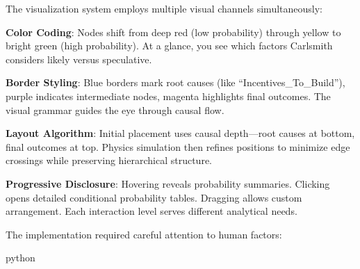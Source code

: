\documentclass[
  11pt,
  letterpaper,
]{book}
\begin{document}
The visualization system employs multiple visual channels
simultaneously:

\textbf{Color Coding}: Nodes shift from deep red (low probability)
through yellow to bright green (high probability). At a glance, you see
which factors Carlsmith considers likely versus speculative.

\textbf{Border Styling}: Blue borders mark root causes (like
``Incentives\_To\_Build''), purple indicates intermediate nodes, magenta
highlights final outcomes. The visual grammar guides the eye through
causal flow.

\textbf{Layout Algorithm}: Initial placement uses causal depth---root
causes at bottom, final outcomes at top. Physics simulation then refines
positions to minimize edge crossings while preserving hierarchical
structure.

\textbf{Progressive Disclosure}: Hovering reveals probability summaries.
Clicking opens detailed conditional probability tables. Dragging allows
custom arrangement. Each interaction level serves different analytical
needs.

The implementation required careful attention to human factors:

python
\end{document}
